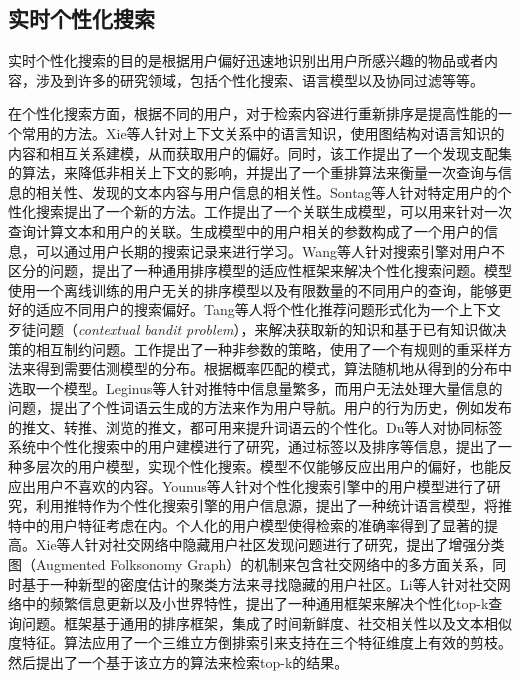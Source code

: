 \subsection{实时个性化搜索}
\label{subsec1:realTimeSearch}
实时个性化搜索的目的是根据用户偏好迅速地识别出用户所感兴趣的物品或者内容，涉及到许多的研究领域，包括个性化搜索、语言模型以及协同过滤等等。

在个性化搜索方面，根据不同的用户，对于检索内容进行重新排序是提高性能的一个常用的方法。Xie等人针对上下文关系中的语言知识，使用图结构对语言知识的内容和相互关系建模，从而获取用户的偏好。同时，该工作提出了一个发现支配集的算法，来降低非相关上下文的影响，并提出了一个重排算法来衡量一次查询与信息的相关性、发现的文本内容与用户信息的相关性。Sontag等人针对特定用户的个性化搜索提出了一个新的方法。工作提出了一个关联生成模型，可以用来针对一次查询计算文本和用户的关联。生成模型中的用户相关的参数构成了一个用户的信息，可以通过用户长期的搜索记录来进行学习。Wang等人针对搜索引擎对用户不区分的问题，提出了一种通用排序模型的适应性框架来解决个性化搜索问题。模型使用一个离线训练的用户无关的排序模型以及有限数量的不同用户的查询，能够更好的适应不同用户的搜索偏好。Tang等人将个性化推荐问题形式化为一个上下文歹徒问题（\textit{contextual bandit problem}），来解决获取新的知识和基于已有知识做决策的相互制约问题。工作提出了一种非参数的策略，使用了一个有规则的重采样方法来得到需要估测模型的分布。根据概率匹配的模式，算法随机地从得到的分布中选取一个模型。Leginus等人针对推特中信息量繁多，而用户无法处理大量信息的问题，提出了个性词语云生成的方法来作为用户导航。用户的行为历史，例如发布的推文、转推、浏览的推文，都可用来提升词语云的个性化。Du等人对协同标签系统中个性化搜索中的用户建模进行了研究，通过标签以及排序等信息，提出了一种多层次的用户模型，实现个性化搜索。模型不仅能够反应出用户的偏好，也能反应出用户不喜欢的内容。Younus等人针对个性化搜索引擎中的用户模型进行了研究，利用推特作为个性化搜索引擎的用户信息源，提出了一种统计语言模型，将推特中的用户特征考虑在内。个人化的用户模型使得检索的准确率得到了显著的提高。Xie等人针对社交网络中隐藏用户社区发现问题进行了研究，提出了增强分类图（Augmented Folksonomy Graph）的机制来包含社交网络中的多方面关系，同时基于一种新型的密度估计的聚类方法来寻找隐藏的用户社区。Li等人针对社交网络中的频繁信息更新以及小世界特性，提出了一种通用框架来解决个性化top-k查询问题。框架基于通用的排序框架，集成了时间新鲜度、社交相关性以及文本相似度特征。算法应用了一个三维立方倒排索引来支持在三个特征维度上有效的剪枝。然后提出了一个基于该立方的算法来检索top-k的结果。

